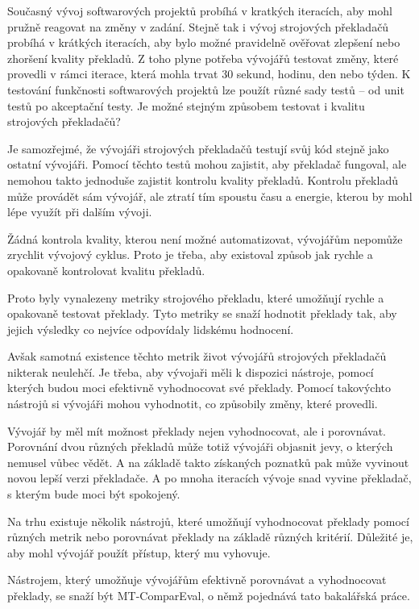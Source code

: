 Současný vývoj softwarových projektů probíhá v kratkých iteracích,
  aby mohl pružně reagovat na změny v zadání.
Stejně tak i vývoj strojových překladačů probíhá v krátkých iteracích,
  aby bylo možné pravidelně ověřovat zlepšení nebo zhoršení kvality překladů.
Z toho plyne potřeba vývojářů testovat změny,
  které provedli v rámci iterace,
  která mohla trvat 30 sekund, hodinu, den nebo týden.
K testování funkčnosti softwarových projektů lze použít různé sady testů -- od unit testů po akceptační testy.
Je možné stejným způsobem testovat i kvalitu strojových překladačů?

Je samozřejmé, 
  že vývojáři strojových překladačů testují svůj kód stejně jako ostatní vývojáři.
Pomocí těchto testů mohou zajistit,
  aby překladač fungoval,
  ale nemohou takto jednoduše zajistit kontrolu kvality překladů.
Kontrolu překladů může provádět sám vývojář,
  ale ztratí tím spoustu času a energie,
  kterou by mohl lépe využít při dalším vývoji.

Žádná kontrola kvality, kterou není možné automatizovat,
  vývojářům nepomůže zrychlit vývojový cyklus.
Proto je třeba,
  aby existoval způsob jak rychle a opakovaně kontrolovat kvalitu překladů.

Proto byly vynalezeny metriky strojového překladu,
  které umožňují rychle a opakovaně testovat překlady.
Tyto metriky se snaží hodnotit překlady tak,
  aby jejich výsledky co nejvíce odpovídaly lidskému hodnocení.

Avšak samotná existence těchto metrik život vývojářů strojových překladačů nikterak neulehčí.
Je třeba, aby vývojaři měli k dispozici nástroje,
  pomocí kterých budou moci efektivně vyhodnocovat své překlady.
Pomocí takovýchto nástrojů si vývojáři mohou vyhodnotit,
  co způsobily změny, které provedli.

Vývojář by měl mít možnost překlady nejen vyhodnocovat,
  ale i porovnávat.
Porovnání dvou různých překladů může totiž vývojáři objasnit jevy,
  o kterých nemusel vůbec vědět.
A na základě takto získaných poznatků pak může vyvinout novou lepší verzi překladače.
A po mnoha iteracích vývoje snad vyvine překladač,
  s kterým bude moci být spokojený.

Na trhu existuje několik nástrojů,
  které umožňují vyhodnocovat překlady pomocí různých metrik
  nebo porovnávat překlady na základě různých kritérií.
Důležité je,
  aby mohl vývojář použít přístup,
  který mu vyhovuje.

Nástrojem,
  který umožňuje vývojářům efektivně porovnávat a vyhodnocovat překlady,
  se snaží být MT-ComparEval, 
  o němž pojednává tato bakalářská práce.
